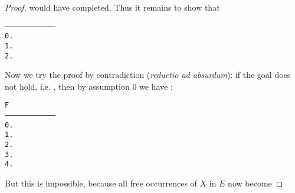 \begin{proof}
would have completed. Thus it remains to show that
\begin{alltt}
   ------------------------------------
    0.  
    1.  
    2.  
\end{alltt}
Now we try the proof by contradiction (\emph{reductio ad absurdum}): if
the goal does not hold, i.e.
, then by assumption 0 we have :
\begin{alltt}
        F
   ------------------------------------
    0.  
    1.  
    2.  
    3.  
    4.  
\end{alltt}
But this is impossible, because all free occurrences of $X$ in $E$ now become

\end{proof}
